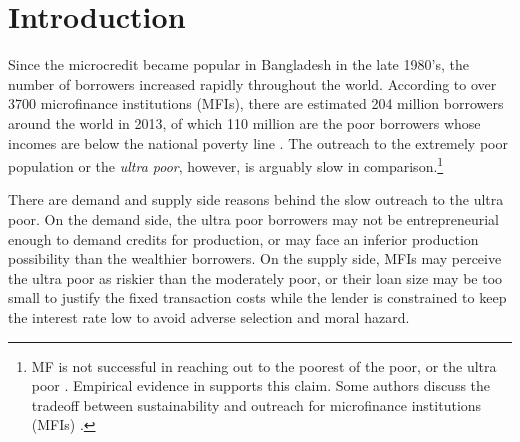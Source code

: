 

\section{Introduction}
\label{SecIntroduction}


	Since the microcredit became popular in Bangladesh in the late 1980's, the number of borrowers increased rapidly throughout the world. According to over 3700 microfinance institutions (MFIs), there are estimated 204 million borrowers around the world in 2013, of which 110 million are the poor borrowers whose incomes are below the national poverty line \citep{MFGateway2015}. The outreach to the extremely poor population or the \textit{ultra poor}, however, is arguably slow in comparison.\footnote{MF is not successful in reaching out to the poorest of the poor, or the ultra poor \citep[][]{Scully2004}. Empirical evidence in \citet{Yaron1994, Navajas2000, RahmanRazzaque2000, AghionMorduch2007} supports this claim. Some authors discuss the tradeoff between sustainability and outreach for microfinance institutions (MFIs) \citet{HermesLensink2011, HermesLensinkMeesters2011, Cull2011}. } 

	There are demand and supply side reasons behind the slow outreach to the ultra poor. On the demand side, the ultra poor borrowers may not be entrepreneurial enough to demand credits for production, or may face an inferior production possibility than the wealthier borrowers. On the supply side, MFIs may perceive the ultra poor as riskier than the moderately poor, or their loan size may be too small to justify the fixed transaction costs while the lender is constrained to keep the interest rate low to avoid adverse selection and moral hazard. 

